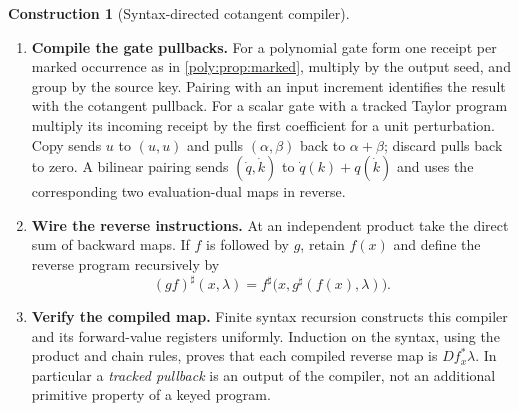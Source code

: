 \documentclass[11pt,a4paper]{article}
\theoremstyle{definition}
\newtheorem{construction}[construction]{Construction}
\theoremstyle{remark}\newaliascnt{remark}{theorem}
\numberwithin{equation}{section}
\begin{document}
\begin{construction}[Syntax-directed cotangent compiler]\label{con:backward-compiler}\leavevmode
\begin{enumerate}[titledsteps]
    \item \textbf{Compile the gate pullbacks.} For a polynomial gate form one receipt per marked occurrence as in \cref{poly:prop:marked}, multiply by the output seed, and group by the source key. Pairing with an input increment identifies the result with the cotangent pullback. For a scalar gate with a tracked Taylor program multiply its incoming receipt by the first coefficient for a unit perturbation. Copy sends $u$ to $(u,u)$ and pulls $(\alpha,\beta)$ back to $\alpha+\beta$; discard pulls back to zero. A bilinear pairing sends $(\dot q,\dot k)$ to $\dot q(k)+q(\dot k)$ and uses the corresponding two evaluation-dual maps in reverse. 
    \item \textbf{Wire the reverse instructions.} At an independent product take the direct sum of backward maps. If $f$ is followed by $g$, retain $f(x)$ and define the reverse program recursively by
\[
 (gf)^\sharp(x,\lambda)
    =f^\sharp\bigl(x,g^\sharp(f(x),\lambda)\bigr).
\]

    \item \textbf{Verify the compiled map.} Finite syntax recursion constructs this compiler and its forward-value registers uniformly. Induction on the syntax, using the product and chain rules, proves that each compiled reverse map is $Df_x^*\lambda$. In particular a \emph{tracked pullback} is an output of the compiler, not an additional primitive property of a keyed program.
\end{enumerate}
\end{construction}
\end{document}
